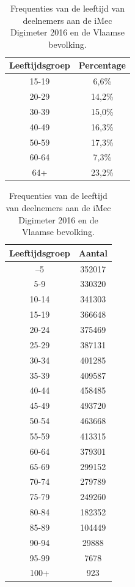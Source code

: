 \begin{table}
  \caption{Frequenties van de leeftijd van deelnemers aan de iMec Digimeter 2016 en de Vlaamse bevolking.}
  \label{tab:frequenties-leeftijden}
  \centering
  \begin{tabular}{cc}
    \textbf{Leeftijdsgroep} & \textbf{Percentage} \\ \midrule
    15-19 & 6,6\% \\
    20-29 & 14,2\% \\
    30-39 & 15,0\% \\
    40-49 & 16,3\% \\
    50-59 & 17,3\% \\
    60-64 & 7,3\% \\
    64+   & 23,2\% \\
  \end{tabular}
  \label{tab:digimeter2016}
  
  \centering
  \begin{tabular}{cc}
    \textbf{Leeftijdsgroep} & \textbf{Aantal} \\ \midrule
    –5            &     352017      \\
    5-9           &     330320      \\
    10-14          &     341303      \\
    15-19          &     366648      \\
    20-24          &     375469      \\
    25-29          &     387131      \\
    30-34          &     401285      \\
    35-39          &     409587      \\
    40-44          &     458485      \\
    45-49          &     493720      \\
    50-54          &     463668      \\
    55-59          &     413315      \\
    60-64          &     379301      \\
    65-69          &     299152      \\
    70-74          &     279789      \\
    75-79          &     249260      \\
    80-84          &     182352      \\
    85-89          &     104449      \\
    90-94          &      29888      \\
    95-99          &      7678       \\
    100+           &       923
  \end{tabular}
  \label{tab:leeftijd-vlaanderen}
    
\end{table}

